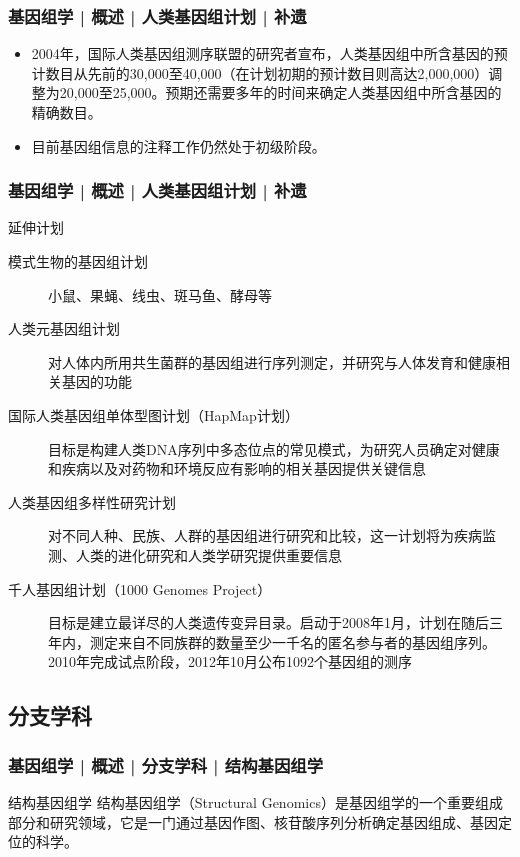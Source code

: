 \begin{frame}
  \frametitle{基因组学 | 概述 | 人类基因组计划 | 补遗}
  \begin{itemize}
    \item 2004年，国际人类基因组测序联盟的研究者宣布，人类基因组中所含基因的预计数目从先前的30,000至40,000（在计划初期的预计数目则高达2,000,000）调整为20,000至25,000。预期还需要多年的时间来确定人类基因组中所含基因的精确数目。
    \item 目前基因组信息的注释工作仍然处于初级阶段。
  \end{itemize}
\end{frame}

\begin{frame}
  \frametitle{基因组学 | 概述 | 人类基因组计划 | 补遗}
  \begin{block}{延伸计划}
    \begin{description}
      \item[模式生物的基因组计划] 小鼠、果蝇、线虫、斑马鱼、酵母等
      \item[人类元基因组计划] 对人体内所用共生菌群的基因组进行序列测定，并研究与人体发育和健康相关基因的功能
      \item[国际人类基因组单体型图计划（HapMap计划）] 目标是构建人类DNA序列中多态位点的常见模式，为研究人员确定对健康和疾病以及对药物和环境反应有影响的相关基因提供关键信息 
      \item[人类基因组多样性研究计划] 对不同人种、民族、人群的基因组进行研究和比较，这一计划将为疾病监测、人类的进化研究和人类学研究提供重要信息
      \item[千人基因组计划（1000 Genomes Project）] 目标是建立最详尽的人类遗传变异目录。启动于2008年1月，计划在随后三年内，测定来自不同族群的数量至少一千名的匿名参与者的基因组序列。2010年完成试点阶段，2012年10月公布1092个基因组的测序
    \end{description}
  \end{block}
\end{frame}

\subsection{分支学科}
\begin{frame}
  \frametitle{基因组学 | 概述 | 分支学科 | 结构基因组学}
  \begin{block}{结构基因组学}
结构基因组学（Structural Genomics）是基因组学的一个重要组成部分和研究领域，它是一门通过基因作图、核苷酸序列分析确定基因组成、基因定位的科学。
  \end{block}
\end{frame}

